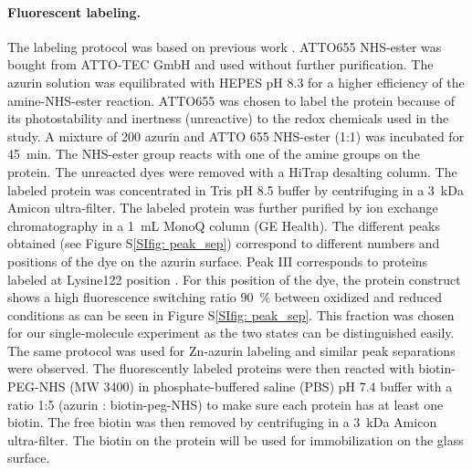 \paragraph*{Fluorescent labeling.}
The labeling protocol was based on previous work \cite{nicolardi2012topdown}.
ATTO655 NHS-ester was bought from ATTO-TEC GmbH and used without further purification.
The azurin solution was equilibrated with HEPES pH 8.3 for a higher efficiency of the amine-NHS-ester reaction.
ATTO655 was chosen to label the protein because of its photostability and inertness (unreactive) to the redox chemicals used in the study.
A mixture of \SI{200}{\uM} azurin and ATTO 655 NHS-ester (1:1) was incubated for \SI{45}{\minute}.
The NHS-ester group reacts with one of the amine groups on the protein.
The unreacted dyes were removed with a HiTrap desalting column.
The labeled protein was concentrated in Tris pH 8.5 buffer by centrifuging in a \SI{3}{ kDa} Amicon ultra-filter.
The labeled protein was further purified by ion exchange chromatography in a \SI{1}{\mL} MonoQ column (GE Health).
The different peaks obtained (see Figure S\ref{SIfig: peak_sep}) correspond to different numbers and positions of the dye on the azurin surface. 
Peak III corresponds to proteins labeled at Lysine122 position \cite{nicolardi2012topdown}.
For this position of the dye, the protein construct shows a high fluorescence switching ratio \SI{90}{\percent} between oxidized and reduced conditions as can be seen in Figure S\ref{SIfig: peak_sep}. This fraction was chosen for our single-molecule experiment as the two states can be distinguished easily.
The same protocol was used for Zn-azurin labeling and similar peak separations were observed.
The fluorescently labeled proteins were then reacted with biotin-PEG-NHS (MW 3400) in phosphate-buffered saline (PBS) pH 7.4 buffer with a ratio 1:5 (azurin : biotin-peg-NHS) to make sure each protein has at least one biotin.
The free biotin was then removed by centrifuging in a \SI{3}{ kDa} Amicon ultra-filter.
The biotin on the protein will be used for immobilization on the glass surface.


